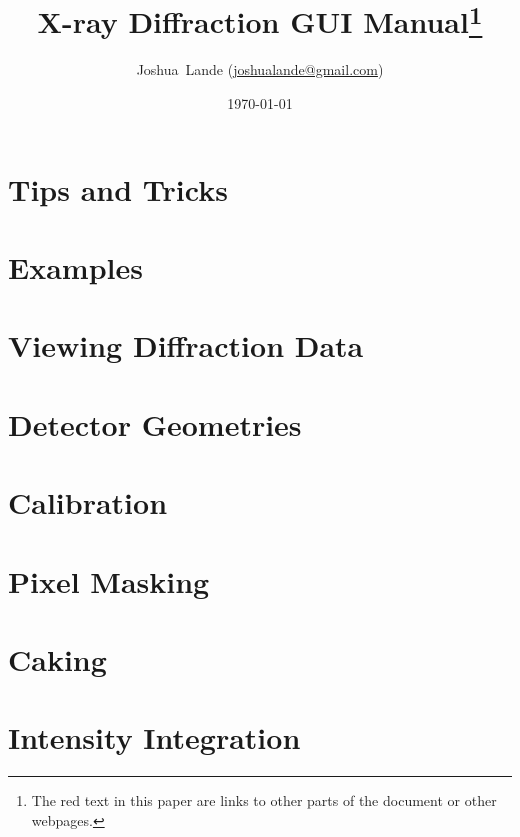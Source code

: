 \documentclass[12pt]{book}
\begin{document}
\title{X-ray Diffraction GUI Manual\footnote{The red text in this paper are links to other parts of the document or other webpages.}}
\date{\today}
\author{Joshua~Lande (\href{mailto:joshualande@gmail.com}{joshualande@gmail.com})}
\maketitle

\tableofcontents

\chapter{Tips and Tricks}


\chapter{Examples}


\chapter{Viewing Diffraction Data}\label{viewing_data}


\chapter{Detector Geometries}


\chapter{Calibration}\label{calibration}



\chapter{Pixel Masking}



\chapter{Caking}\label{Caking}


\chapter{Intensity Integration}

\end{document}
